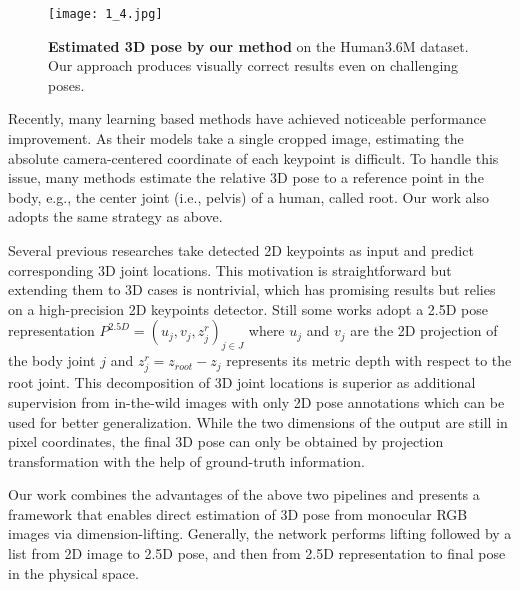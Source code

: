 \documentclass[letterpaper]{article} \usepackage{aaai21}  \usepackage{times}  \usepackage{helvet} \usepackage{courier}  \usepackage[hyphens]{url}  \usepackage{graphicx} \urlstyle{rm} \def\UrlFont{\rm}  \usepackage{natbib}  \usepackage{caption} \frenchspacing  \setlength{\pdfpagewidth}{8.5in}  \setlength{\pdfpageheight}{11in}
\begin{document}
\begin{figure}[ht]
\centering
\texttt{[image: 1\_4.jpg]} \caption{\textbf{Estimated 3D pose by our method }on the Human3.6M dataset. Our approach produces visually correct results even on challenging poses.}
\label{fig1}
\end{figure}

Recently, many learning based methods \cite{martinez2017simple,pavlakos2017coarse,sun2017compositional,sun2018integral,yang20183d} have achieved noticeable performance improvement. As their models take a single cropped image, estimating the absolute camera-centered coordinate of each keypoint is difficult. To handle this issue, many methods estimate the relative 3D pose to a reference point in the body, e.g., the center joint (i.e., pelvis) of a human, called root. Our work also adopts the same strategy as above. 

Several previous researches \cite{moreno20173d,martinez2017simple,wang2019not,sharma2019monocular} take detected 2D keypoints as input and predict corresponding 3D joint locations. This motivation is straightforward but extending them to 3D cases is nontrivial, which has promising results but relies on a high-precision 2D keypoints detector. Still some works \cite{pavlakos2018ordinal,sun2018integral,zhou2019hemlets} adopt a 2.5D pose representation $P^{2.5D} = (u_j,v_j,z_j^{r})_{j \in J} $ where $u_j$ and $v_j$ are the 2D projection of the body joint $j$ and $z_j^{r} = z_{root}-z_j$ represents its metric depth with respect to the root joint. This decomposition of 3D joint locations is superior as additional supervision from in-the-wild images with only 2D pose annotations which can be used for better generalization. While the two dimensions of the output are still in pixel coordinates, the final 3D pose can only be obtained by projection transformation with the help of ground-truth information. 

Our work combines the advantages of the above two pipelines and presents a framework that enables direct estimation of 3D pose from monocular RGB images via dimension-lifting. Generally, the network performs lifting followed by a list from 2D image to 2.5D pose, and then from 2.5D representation to final pose in the physical space.
\end{document}
